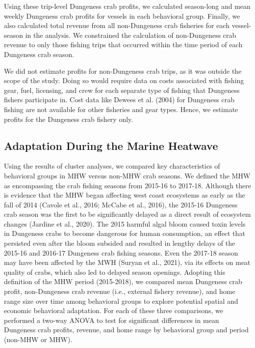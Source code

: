 \documentclass[]{elsarticle} %
\begin{document}
Using these trip-level Dungeness crab profits, we calculated season-long
and mean weekly Dungeness crab profits for vessels in each behavioral
group. Finally, we also calculated total revenue from all non-Dungeness
crab fisheries for each vessel-season in the analysis. We constrained
the calculation of non-Dungeness crab revenue to only those fishing
trips that occurred within the time period of each Dungeness crab
season.

We did not estimate profits for non-Dungeness crab trips, as it was
outside the scope of the study. Doing so would require data on costs
associated with fishing gear, fuel, licensing, and crew for each
separate type of fishing that Dungeness fishers participate in. Cost
data like Dewees et al. (2004) for Dungeness crab fishing are not
available for other fisheries and gear types. Hence, we estimate profits
for the Dungeness crab fishery only.

\hypertarget{adaptation-during-the-marine-heatwave}{%
\subsection{Adaptation During the Marine
Heatwave}\label{adaptation-during-the-marine-heatwave}}

Using the results of cluster analyses, we compared key characteristics
of behavioral groups in MHW versus non-MHW crab seasons. We defined the
MHW as encompassing the crab fishing seasons from 2015-16 to 2017-18.
Although there is evidence that the MHW began affecting west coast
ecosystems as early as the fall of 2014 (Cavole et al., 2016; McCabe et
al., 2016), the 2015-16 Dungeness crab season was the first to be
significantly delayed as a direct result of ecosystem changes (Jardine
et al., 2020). The 2015 harmful algal bloom caused toxin levels in
Dungeness crabs to become dangerous for human consumption, an effect
that persisted even after the bloom subsided and resulted in lengthy
delays of the 2015-16 and 2016-17 Dungeness crab fishing seasons. Even
the 2017-18 season may have been affected by the MWH (Suryan et al.,
2021), via its effects on meat quality of crabs, which also led to
delayed season openings. Adopting this definition of the MHW period
(2015-2018), we compared mean Dungeness crab profit, non-Dungeness crab
revenue (i.e., external fishery revenue), and home range size over time
among behavioral groups to explore potential spatial and economic
behavioral adaptation. For each of these three comparisons, we performed
a two-way ANOVA to test for significant differences in mean Dungeness
crab profits, revenue, and home range by behavioral group and period
(non-MHW or MHW).
\end{document}

